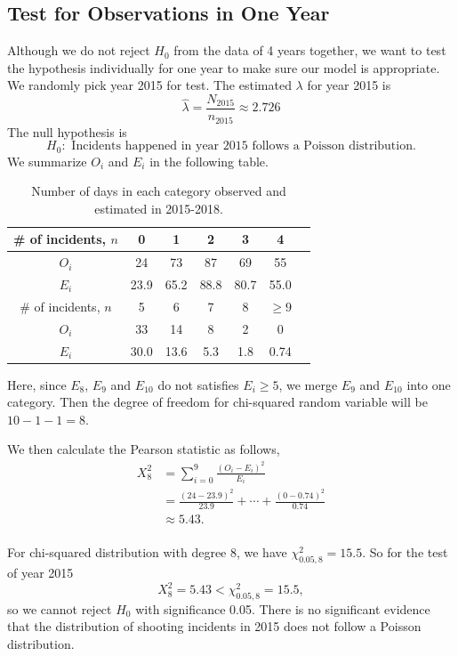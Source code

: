 \documentclass[11pt,a4paper,english]{article}
\begin{document}
\subsection{Test for Observations in One Year}
Although we do not reject $H_{0}$ from the data of 4 years together, we want to test the hypothesis individually for one year to make sure our model is appropriate. We randomly pick year 2015 for test. The estimated $\lambda$ for year 2015 is 
\begin{equation*}
	\hat{\lambda} = \frac{N_{2015}}{n_{2015}} \approx 2.726
\end{equation*}
The null hypothesis is 
\[H_{0}:\text{ Incidents happened in year 2015 follows a Poisson distribution.}\]
We summarize $O_{i}$ and $E_{i}$ in the following table.

\begin{table}[htbp]
    \centering
	\begin{tabular}{c|cccccc}
		\hline
        \# of incidents, $n$ & 0 & 1 & 2 & 3 & 4  \\
		\hline
		$O_{i}$ & 24 & 73 & 87 & 69 & 55 \\
		\hline
		$E_{i}$ & 23.9 & 65.2 & 88.8 & 80.7 & 55.0 \\ 
		\hline
		\hline
		\# of incidents, $n$ & 5 & 6 & 7 & 8 & $\geq 9$  \\
		\hline
		$O_{i}$ & 33 & 14 & 8 & 2 & 0\\
		\hline
		$E_{i}$ & 30.0 & 13.6 & 5.3 & 1.8 & 0.74\\ 
		\hline 
    \end{tabular}
	\caption{Number of days in each category observed and estimated in 2015-2018.}
\end{table}

Here, since $E_{8}$, $E_{9}$ and $E_{10}$ do not satisfies $E_{i} \geq 5$, we merge $E_{9}$ and $E_{10}$ into one category. Then the degree of freedom for chi-squared random variable will be $10-1-1 = 8$.

We then calculate the Pearson statistic as follows,
\begin{align*}
	X_{8}^{2} &= \sum_{i = 0}^{9}\frac{(O_{i}-E_{i})^{2}}{E_{i}}\\
	&= \frac{(24-23.9)^{2}}{23.9}+\cdots+\frac{(0-0.74)^{2}}{0.74}\\
	&\approx 5.43.\\
\end{align*}

For chi-squared distribution with degree 8, we have $\chi_{0.05,8}^{2} = 15.5$. So for the test of year 2015
\begin{equation*}
	X_{8}^{2} = 5.43 < \chi_{0.05,8}^{2} = 15.5,
\end{equation*}
so we cannot reject $H_{0}$ with significance 0.05.
There is no significant evidence that the distribution of shooting incidents in 2015 does not follow a Poisson distribution.
\end{document}
